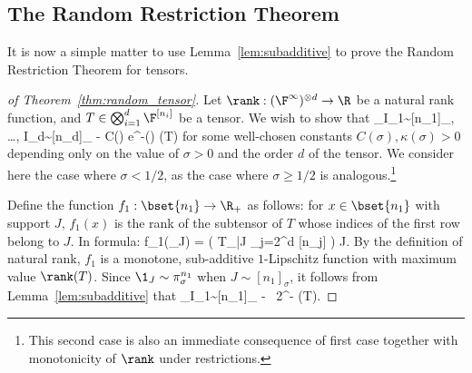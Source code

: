 \subsection{The Random Restriction Theorem}

It is now a simple matter to use Lemma~\ref{lem:subadditive} to prove the Random Restriction Theorem for tensors.

\begin{proof}[ of Theorem~\ref{thm:random_tensor}]
Let $\rank: (\F^{\infty})^{\otimes d} \to \R$ be a natural rank function, and $T \in \bigotimes_{i=1}^d \F^{[n_i]}$ be a tensor.
We wish to show that
\beqn
\Pr_{I_1\sim [n_1]_{\sigma}, \dots, I_d\sim [n_d]_{\sigma}}  - C(\sigma) e^{-\kappa(\sigma) \rank(T)}
\eeqn
for some well-chosen constants $C(\sigma), \kappa(\sigma) > 0$ depending only on the value of $\sigma > 0$ and the order $d$ of the tensor.
We consider here the case where $\sigma < 1/2$, as the case where $\sigma \geq 1/2$ is analogous.\footnote{This second case is also an immediate consequence of first case together with monotonicity of $\rank$ under restrictions.}

Define the function $f_1: \bset{n_1} \to \R_+$ as follows:
for $x \in \bset{n_1}$ with support $J$, $f_1(x)$ is the rank of the subtensor of $T$ whose indices of the first row belong to $J$.
In formula:
\beqn
f_1(\1_{J}) = \rank\big( T_{|J \times \prod_{j=2}^d [n_j]} \big) \quad {} J\subseteq [n_1].
\eeqn
By the definition of natural rank, $f_1$ is a monotone, sub-additive $1$-Lipschitz function with maximum value $\rank(T)$.
Since $\1_J \sim \pi_{\sigma}^{n_1}$ when $J\sim [n_1]_{\sigma}$, it follows from Lemma~\ref{lem:subadditive} that
\beq \label{eq:f1}
\Pr_{I_1\sim [n_1]_{\sigma}}\bigg[ \rank\big( T_{|I_1 \times \prod_{j=2}^d [n_j]} \big) \geq \frac{\sigma \rank(T)}{4}\bigg]  - \, 2^{- \rank(T)}.
\eeq


\end{proof}
